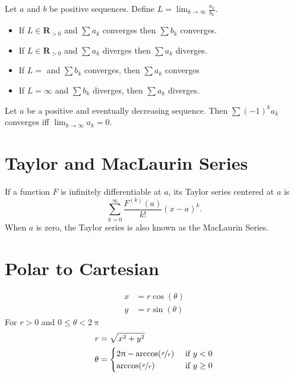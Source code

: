 \documentclass[letterpaper,landscape,9pt,fleqn]{extarticle}
\newcommand{\reals}{\mathbf{R}}
\begin{document}
\begin{multicols*}{2}
\begin{minipage}[c]{0.5\textwidth}

Let $a$ and $b$ be positive sequences. Define 
$L = \lim_{k \to \infty} \frac{a_k}{b_k}$.
\begin{itemize}[noitemsep]
    \item If $L \in \reals_{> 0}$ and $\sum a_k$ converges then  
    $\sum b_k$ converges.

    \item If $L \in \reals_{> 0}$ and $\sum a_k$ diverges then  
    $\sum a_k$ diverges.

    \item If $L = $ and $\sum b_k$  converges, then $\sum a_k $  converges
   
    \item If $L = \infty$ and $\sum b_k$ diverges, then $\sum a_k $ diverges.  
\end{itemize}

Let  $a$ be a positive and eventually decreasing sequence. 
Then $\sum (-1)^k a_k$ converges iff $\lim_{k \to \infty} a_k = 0$.

\end{minipage}



\vspace{0.25in}
\section*{Taylor and MacLaurin Series}
\vspace{0.25in}
If a function $F$ is infinitely differentiable at $a$, its Taylor series centered at $a$ is
\begin{equation*}
  \sum_{k=0}^\infty \frac{F^{(k)}(a)}{k!}  (x-a)^k.
\end{equation*}
When $a$ is zero, the Taylor series is also known as the MacLaurin Series.
\section*{Polar to Cartesian}
\vspace{-0.25in}
\begin{minipage}[c]{0.25\textwidth}
\begin{align*}
x &= r \cos(\theta) \\
y &= r \sin(\theta)
\end{align*}
For $r > 0$ and $0 \leq \theta < 2 \uppi$
\begin{align*}
r &= \sqrt{x^2 + y^2} \\
\theta &= \begin{cases} 2 \uppi - \arccos(\nicefrac{x}{r})  & \mbox{ if } y < 0  \\
  \arccos(\nicefrac{x}{r})  & \mbox{ if } y \geq 0 
             \end{cases}    
\end{align*}
\end{minipage}      


\end{multicols*}
\end{document}
